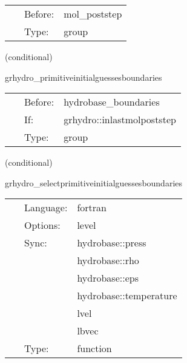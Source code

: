 \hspace{5mm}{\it apply boundary conditions to all primitives } 


\hspace{5mm}

 \begin{tabular*}{160mm}{cll} 
~ & Before:  & mol\_poststep \\ 
~ & Type:  & group \\ 
\end{tabular*} 


\vspace{5mm}

   (conditional) 

\hspace{5mm} grhydro\_primitiveinitialguessesboundaries 

\hspace{5mm}{\it apply boundary conditions to those primitives used as initial guesses } 


\hspace{5mm}

 \begin{tabular*}{160mm}{cll} 
~ & Before:  & hydrobase\_boundaries \\ 
~ & If:  & grhydro::inlastmolpoststep \\ 
~ & Type:  & group \\ 
\end{tabular*} 


\vspace{5mm}

   (conditional) 

\hspace{5mm} grhydro\_selectprimitiveinitialguessesboundaries 

\hspace{5mm}{\it select initial guess primitive variables for boudary conditions } 


\hspace{5mm}

 \begin{tabular*}{160mm}{cll} 
~ & Language:  & fortran \\ 
~ & Options:  & level \\ 
~ & Sync:  & hydrobase::press \\ 
~& ~ &hydrobase::rho\\ 
~& ~ &hydrobase::eps\\ 
~& ~ &hydrobase::temperature\\ 
~& ~ &lvel\\ 
~& ~ &lbvec\\ 
~ & Type:  & function \\ 
\end{tabular*} 


